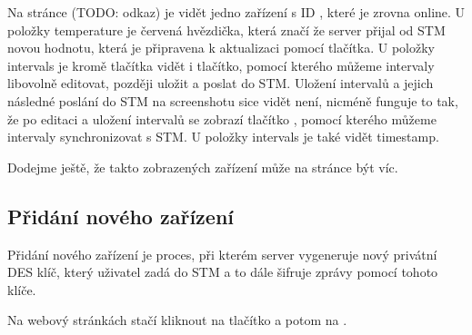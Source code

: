 Na stránce (TODO: odkaz) je vidět jedno zařízení s ID , které je zrovna online.
U položky temperature je červená hvězdička, která značí že server přijal od STM novou hodnotu, která
je připravena k aktualizaci pomocí  tlačítka.
U položky intervals je kromě  tlačítka vidět i  tlačítko, pomocí kterého můžeme intervaly
libovolně editovat, později uložit a poslat do STM.
Uložení intervalů a jejich následné poslání do STM na screenshotu sice vidět není, nicméně funguje to
tak, že po editaci a uložení intervalů se zobrazí tlačítko , pomocí kterého můžeme
intervaly synchronizovat s STM.
U položky intervals je také vidět timestamp.

Dodejme ještě, že takto zobrazených zařízení může na stránce být víc.

\subsection{Přidání nového zařízení}
Přidání nového zařízení je proces, při kterém server vygeneruje nový privátní DES klíč, který uživatel
zadá do STM a to dále šifruje zprávy pomocí tohoto klíče.

Na webový stránkách stačí kliknout na tlačítko  a potom na .


